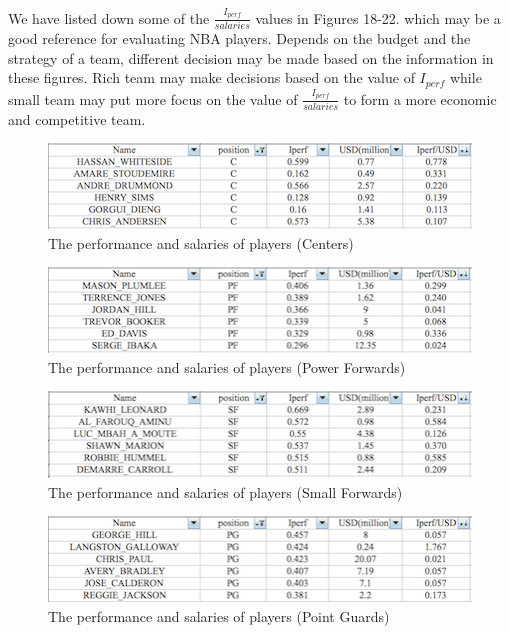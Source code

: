 \documentclass{acm_proc_article-sp}
\begin{document}
We have listed down some of the $\frac{I_{perf}}{salaries}$ values in Figures 18-22. which may be a good reference for evaluating NBA players. Depends on the budget and the strategy of a team, different decision may be made based on the information in these figures. Rich team may make decisions based on the value of $I_{perf}$ while small team may put more focus on the value of $\frac{I_{perf}}{salaries}$ to form a more economic and competitive team.

\begin{figure}[!htb]
\centering
\includegraphics{Fig-19.png}
\caption{The performance and salaries of players (Centers)}
\end{figure}

\begin{figure}[!htb]
\centering
\includegraphics{Fig-20.png}
\caption{The performance and salaries of players (Power Forwards)}
\end{figure}

\begin{figure}[!htb]
\centering
\includegraphics{Fig-21.png}
\caption{The performance and salaries of players (Small Forwards)}
\end{figure}

\begin{figure}[!htb]
\centering
\includegraphics{Fig-22.png}
\caption{The performance and salaries of players (Point Guards)}
\end{figure}
\end{document}
